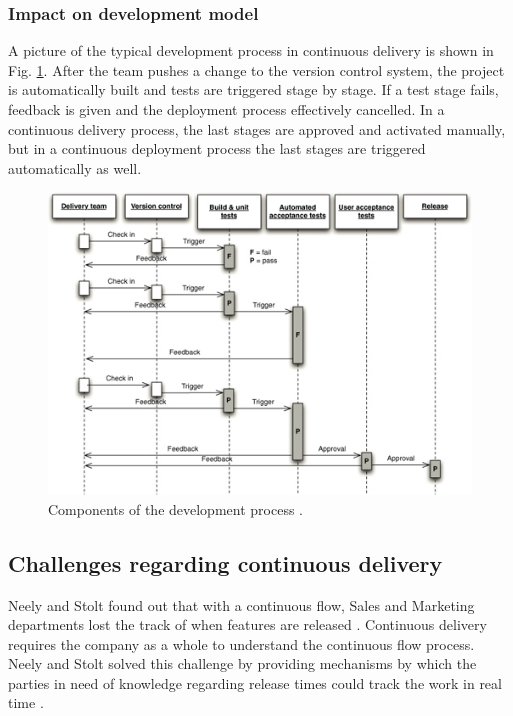 \documentclass[english]{tktltiki2}
\theoremstyle{definition}
\theoremstyle{remark}
\begin{document}
\subsubsection{Impact on development model}

A picture of the typical development process in continuous delivery is shown in Fig. \ref{fig3}. After the team pushes a change to the version control system, the project is automatically built and tests are triggered stage by stage. If a test stage fails, feedback is given and the deployment process effectively cancelled. In a continuous delivery process, the last stages are approved and activated manually, but in a continuous deployment process the last stages are triggered automatically as well.

\begin{figure}[h]
	\centering
	\includegraphics[width=5.0in]{developmentprocess.jpg}
	\caption{Components of the development process \cite{cdbook}.}
	\label{fig3}
\end{figure}

\subsection{Challenges regarding continuous delivery}

Neely and Stolt found out that with a continuous flow, Sales and Marketing departments lost the track of when features are released \cite{neely2013continuous}. Continuous delivery requires the company as a whole to understand the continuous flow process. Neely and Stolt solved this challenge by providing mechanisms by which the parties in need of knowledge regarding release times could track the work in real time \cite{neely2013continuous}. 
\end{document}
